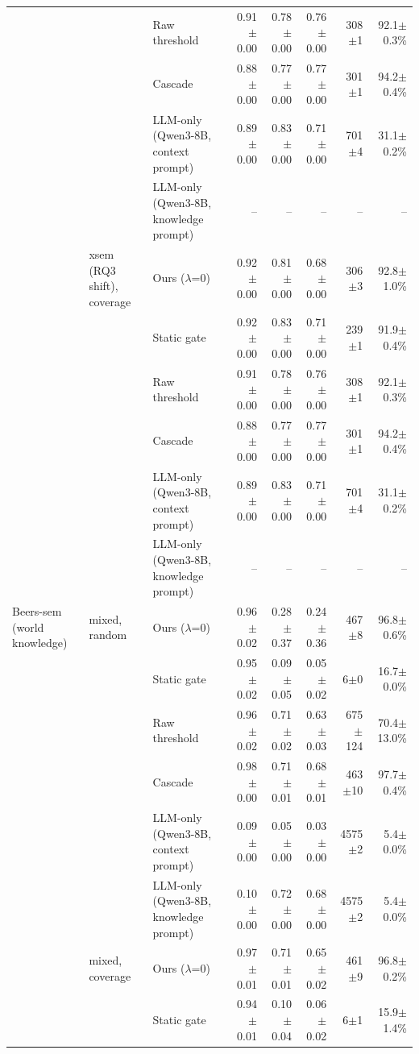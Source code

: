{\begin{longtable}{lllrrrrr}
 &  & Raw threshold & 0.91$\pm$0.00 & 0.78$\pm$0.00 & 0.76$\pm$0.00 & 308$\pm$1 & 92.1$\pm$0.3\% \\
 &  & Cascade & 0.88$\pm$0.00 & 0.77$\pm$0.00 & 0.77$\pm$0.00 & 301$\pm$1 & 94.2$\pm$0.4\% \\
 &  & LLM-only (Qwen3-8B, context prompt) & 0.89$\pm$0.00 & 0.83$\pm$0.00 & 0.71$\pm$0.00 & 701$\pm$4 & 31.1$\pm$0.2\% \\
 &  & LLM-only (Qwen3-8B, knowledge prompt) & -- & -- & -- & -- & -- \\
 & xsem (RQ3 shift), coverage & Ours ($\lambda$=0) & 0.92$\pm$0.00 & 0.81$\pm$0.00 & 0.68$\pm$0.00 & 306$\pm$3 & 92.8$\pm$1.0\% \\
 &  & Static gate & 0.92$\pm$0.00 & 0.83$\pm$0.00 & 0.71$\pm$0.00 & 239$\pm$1 & 91.9$\pm$0.4\% \\
 &  & Raw threshold & 0.91$\pm$0.00 & 0.78$\pm$0.00 & 0.76$\pm$0.00 & 308$\pm$1 & 92.1$\pm$0.3\% \\
 &  & Cascade & 0.88$\pm$0.00 & 0.77$\pm$0.00 & 0.77$\pm$0.00 & 301$\pm$1 & 94.2$\pm$0.4\% \\
 &  & LLM-only (Qwen3-8B, context prompt) & 0.89$\pm$0.00 & 0.83$\pm$0.00 & 0.71$\pm$0.00 & 701$\pm$4 & 31.1$\pm$0.2\% \\
 &  & LLM-only (Qwen3-8B, knowledge prompt) & -- & -- & -- & -- & -- \\
\midrule
Beers-sem (world knowledge) & mixed, random & Ours ($\lambda$=0) & 0.96$\pm$0.02 & 0.28$\pm$0.37 & 0.24$\pm$0.36 & 467$\pm$8 & 96.8$\pm$0.6\% \\
 &  & Static gate & 0.95$\pm$0.02 & 0.09$\pm$0.05 & 0.05$\pm$0.02 & 6$\pm$0 & 16.7$\pm$0.0\% \\
 &  & Raw threshold & 0.96$\pm$0.02 & 0.71$\pm$0.02 & 0.63$\pm$0.03 & 675$\pm$124 & 70.4$\pm$13.0\% \\
 &  & Cascade & 0.98$\pm$0.00 & 0.71$\pm$0.01 & 0.68$\pm$0.01 & 463$\pm$10 & 97.7$\pm$0.4\% \\
 &  & LLM-only (Qwen3-8B, context prompt) & 0.09$\pm$0.00 & 0.05$\pm$0.00 & 0.03$\pm$0.00 & 4575$\pm$2 & 5.4$\pm$0.0\% \\
 &  & LLM-only (Qwen3-8B, knowledge prompt) & 0.10$\pm$0.00 & 0.72$\pm$0.00 & 0.68$\pm$0.00 & 4575$\pm$2 & 5.4$\pm$0.0\% \\
 & mixed, coverage & Ours ($\lambda$=0) & 0.97$\pm$0.01 & 0.71$\pm$0.01 & 0.65$\pm$0.02 & 461$\pm$9 & 96.8$\pm$0.2\% \\
 &  & Static gate & 0.94$\pm$0.01 & 0.10$\pm$0.04 & 0.06$\pm$0.02 & 6$\pm$1 & 15.9$\pm$1.4\% \\

\end{longtable}}
